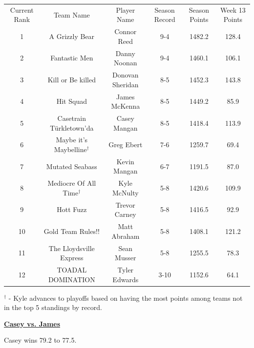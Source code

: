 \documentclass[11pt,letterpaper]{article}
\begin{document}
\newpage
{}
\vspace{-25pt}
\begin{table} [h]
\footnotesize
\begin{center}
\begin{tabular} { c c c c c c }
\\[3mm] Current Rank & Team Name & Player Name & Season Record &  Season Points & Week 13 Points
\\[3mm] 1 & A Grizzly Bear & Connor Reed & 9-4 & 1482.2 & 128.4
\\ 2 & Fantastic Men & Danny Noonan & 9-4 & 1460.1 & 106.1
\\ 3 & Kill or Be killed & Donovan Sheridan & 8-5 & 1452.3 & 143.8
\\ 4 & Hit Squad & James McKenna & 8-5 & 1449.2 & 85.9
\\ 5 & Casetrain T\"{u}rkletown'da & Casey Mangan & 8-5 & 1418.4 & 113.9
\\ 6 & Maybe it's Maybelline$^\dag$ & Greg Ebert & 7-6 & 1259.7 & 69.4
\\ 7 & Mutated Seabass & Kevin Mangan & 6-7 & 1191.5 & 87.0
\\ 8 & Mediocre Of All Time$^\dag$ & Kyle McNulty & 5-8 & 1420.6 & 109.9
\\ 9 & Hott Fuzz & Trevor Carney & 5-8 & 1416.5 & 92.9
\\ 10 & Gold Team Rules!! & Matt Abraham & 5-8 & 1408.1 & 121.2
\\ 11 & The Lloydsville Express & Sean Musser & 5-8 & 1255.5 & 78.3
\\ 12 & TOADAL DOMINATION & Tyler Edwards & 3-10 & 1152.6 & 64.1
\end{tabular}
\end{center}
\noindent$^\dag$ - Kyle advances to playoffs based on having the most points among teams not in the top 5 standings by record.
\end{table}



\newpage
{}


\textbf{\href{http://games.espn.com/ffl/boxscorefull?leagueId=1016777&teamId=10&scoringPeriodId=14&seasonId=2016&view=scoringperiod&version=full}
{Casey vs. James}}
\par\noindent Casey wins 79.2 to 77.5.
\bigskip
\par\noindent
\end{document}
